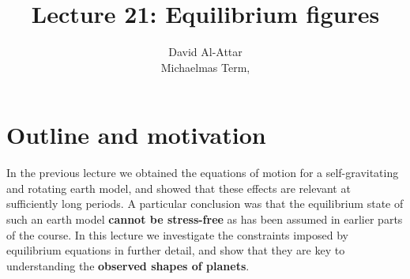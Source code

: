 \documentclass[a4paper,12pt]{paper}
\title{Lecture 21: Equilibrium figures}
\author{David Al-Attar \\ Michaelmas Term, \the\year}
\providecommand{\DIFadd}[1]{{\protect\color{blue}\uwave{#1}}} %
\providecommand{\DIFaddbegin}{} %
\providecommand{\DIFaddend}{} %
\providecommand{\DIFdelbegin}{} %
\providecommand{\DIFdelend}{} %
\begin{document}
\maketitle
\DIFdelbegin %

\DIFdelend \section*{Outline and motivation}
In the previous lecture we obtained the equations of motion for a self-gravitating and rotating earth model,
 and showed that these effects are relevant at sufficiently long periods. A particular conclusion was that the equilibrium 
 state of such an earth model \textbf{cannot be stress-free} as has been assumed in earlier parts of the course. 
 In this lecture we investigate the constraints imposed by \DIFaddbegin \DIFadd{the }\DIFaddend equilibrium equations in further detail, and show that they are 
 key to understanding the \textbf{observed shapes of planets}.
\end{document}
